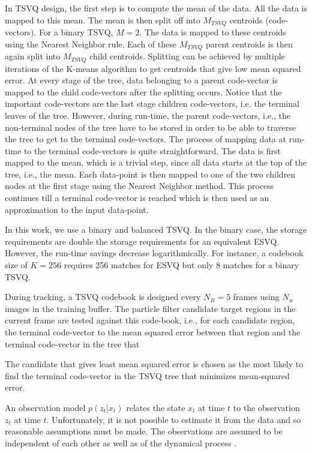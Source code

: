 In TSVQ design, the first step is to compute the mean of the data.  All the data is mapped to this mean.  The mean is then split off into $M_{TSVQ}$ centroids (code-vectors).  For a binary TSVQ, $M=2$.  The data is mapped to these centroids using the Nearest Neighbor rule.  Each of these $M_{TSVQ}$ parent centroids is then again split into $M_{TSVQ}$ child centroids.  Splitting can be achieved by multiple iterations of the K-means algorithm to get centroids that give low mean squared error.  At every stage of the tree, data belonging to a parent code-vector is mapped to the child code-vectors after the splitting occurs.  Notice that the important code-vectors are the last stage children code-vectors, i.e. the terminal leaves of the tree.  However, during run-time, the parent code-vectors, i.e., the non-terminal nodes of the tree have to be stored in order to be able to traverse the tree to get to the terminal code-vectors.  The process of mapping data at run-time to the terminal code-vectors is quite straightforward.  The data is first mapped to the mean, which is a trivial step, since all data starts at the top of the tree, i.e., the mean.  Each data-point is then mapped to one of the two children nodes at the first stage using the Nearest Neighbor method.  This process continues till a terminal code-vector is reached which is then used as an approximation to the input data-point.

In this work, we use a binary and balanced TSVQ.  In the binary case, the storage requirements are double the storage requirements for an equivalent ESVQ.  However, the run-time savings decrease logarithmically.  For instance, a codebook size of $K=256$ requires 256 matches for ESVQ but only 8 matches for a binary TSVQ.  

During tracking, a TSVQ codebook is designed every $N_B=5$ frames using $N_w$ images in the training buffer.  The particle filter candidate target regions in the current frame are tested against this code-book, i.e., for each candidate region, the terminal code-vector  to the mean squared error between that region and the terminal code-vector in the tree that 

The candidate that gives least mean squared error is chosen as the most likely  to find the terminal code-vector in the TSVQ tree that minimizes mean-squared error.  

An observation model $p(z_t|x_t)$ relates the state $x_t$ at time $t$ to the observation $z_t$ at time $t$.  Unfortunately, it is not possible to estimate it from the data and so reasonable assumptions must be made.  The observations are assumed to be independent of each other as well as of the dynamical process \cite{1998_JNL_Condensation_IsardBlake}. 

